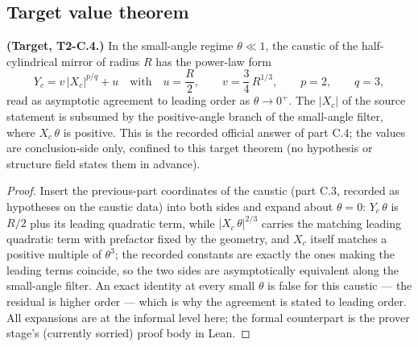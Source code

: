 \subsection*{Target value theorem}

\begin{theorem}
\label{thm:IPhO2026Problems_problem_IPhO_2026_2_C_4:caustic_small_angle_power_law}
\textbf{(Target, T2-C.4.)}  In the small-angle regime $\theta \ll 1$, the
caustic of the half-cylindrical mirror of radius $R$ has the power-law form
\[
Y_c = v\,|X_c|^{p/q} + u
\quad\text{with}\quad
u = \frac{R}{2},\qquad
v = \frac{3}{4}\,R^{1/3},\qquad
p = 2,\qquad q = 3,
\]
read as asymptotic agreement to leading order as $\theta \to 0^{+}$.  The
$|X_c|$ of the source statement is subsumed by the positive-angle branch of
the small-angle filter, where $X_c\,\theta$ is positive.  This is the
recorded official answer of part C.4; the values are conclusion-side only,
confined to this target theorem (no hypothesis or structure field states
them in advance).
\end{theorem}
\begin{proof}
Insert the previous-part coordinates of the caustic (part C.3, recorded as
hypotheses on the caustic data) into both sides and expand about
$\theta = 0$: $Y_c\,\theta$ is $R/2$ plus its leading quadratic term, while
$|X_c\,\theta|^{2/3}$ carries the matching leading quadratic term with
prefactor fixed by the geometry, and $X_c$ itself matches a positive
multiple of $\theta^{3}$; the recorded constants are exactly the ones making
the leading terms coincide, so the two sides are asymptotically equivalent
along the small-angle filter.  An exact identity at every small $\theta$ is
false for this caustic --- the residual is higher order --- which is why the
agreement is stated to leading order.  All expansions are at the informal
level here; the formal counterpart is the prover stage's (currently
sorried) proof body in Lean.
\end{proof}
